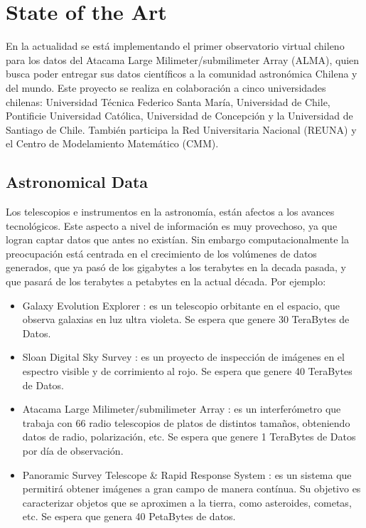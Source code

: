 \section{State of the Art}

En la actualidad se está implementando el primer observatorio virtual chileno
para los datos del Atacama Large Milimeter/submilimeter Array (ALMA), quien
busca poder entregar sus datos científicos a la comunidad astronómica Chilena y
del mundo. Este proyecto se realiza en colaboración a cinco universidades
chilenas: Universidad Técnica Federico Santa María, Universidad de Chile,
Pontificie Universidad Católica, Universidad de Concepción y la Universidad de
Santiago de Chile. También participa la Red Universitaria Nacional (REUNA) y el
Centro de Modelamiento Matemático (CMM).

\subsection{Astronomical Data}
Los telescopios e instrumentos en la astronomía, están afectos a los avances
tecnológicos. Este aspecto a nivel de información es muy provechoso, ya que
logran captar datos que antes no existían. Sin embargo computacionalmente la
preocupación está centrada en el crecimiento de los volúmenes de datos
generados, que ya pasó de los gigabytes a los terabytes en la decada pasada, y
que pasará de los terabytes a petabytes en la actual década. Por ejemplo:
\begin{itemize}
	\item Galaxy Evolution Explorer \cite{galex}: es un telescopio
orbitante en el espacio, que observa galaxias en luz ultra violeta. Se espera
que genere 30 TeraBytes de Datos.
	\item Sloan Digital Sky Survey \cite{sloan}: es un proyecto de inspección de
imágenes en el espectro visible y de corrimiento al rojo. Se espera que genere
40 TeraBytes de Datos.
	\item Atacama Large Milimeter/submilimeter Array \cite{alma}: es un
interferómetro que trabaja con 66 radio telescopios de platos de distintos
tamaños, obteniendo datos de radio, polarización, etc. Se espera que genere 1
TeraBytes de Datos por día de observación.
	\item Panoramic Survey Telescope \& Rapid Response System \cite{pan}:
es un sistema que permitirá obtener imágenes a gran campo de manera contínua.
Su objetivo es caracterizar objetos que se aproximen a la tierra, como
asteroides, cometas, etc. Se espera que genera 40 PetaBytes de datos.
\end{itemize}

